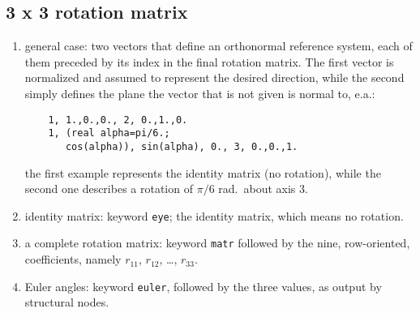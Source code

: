 \subsection{3 x 3 rotation matrix}
\begin{enumerate}
    \item general case: two vectors that define an orthonormal reference
    system, each of them preceded by its index in the final rotation 
    matrix. The first vector is normalized and assumed to represent the
    desired direction, while the second simply defines the plane the
    vector that is not given is normal to, e.a.:
    \begin{verbatim}
    1, 1.,0.,0., 2, 0.,1.,0.
    1, (real alpha=pi/6.; 
       cos(alpha)), sin(alpha), 0., 3, 0.,0.,1.
    \end{verbatim}
    the first example represents the identity matrix (no rotation),
    while the second one describes a rotation of $ \pi/6 $ rad.\ about
    axis 3.
    \item identity matrix: keyword \texttt{eye}; the identity matrix, which means
    no rotation.
    \item a complete rotation matrix: keyword \texttt{matr} followed by the
    nine, row-oriented, coefficients, namely $ r_{11} $, $ r_{12} $, \ldots,
    $ r_{33} $.
    \item Euler angles: keyword \texttt{euler}, followed by the three
    values, as output by structural nodes.
\end{enumerate}
